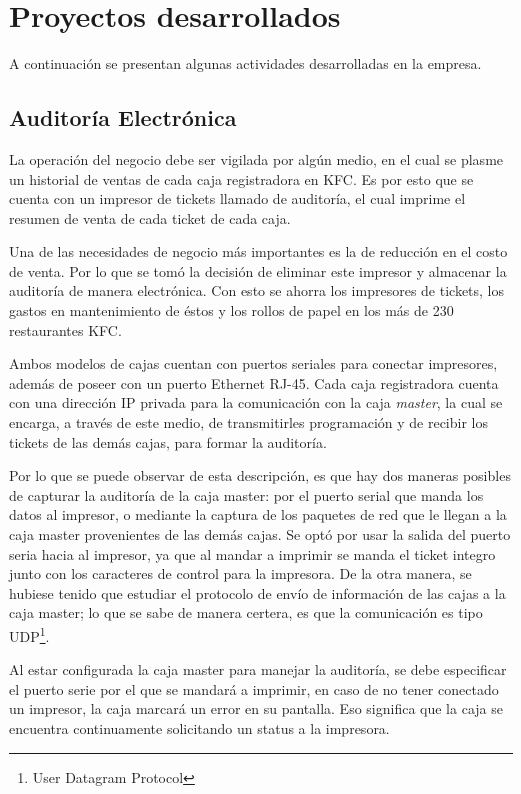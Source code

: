 
\chapter{Proyectos desarrollados}
\label{chap:desarrollo}

A continuación se presentan algunas actividades desarrolladas en la empresa.

\section{Auditoría Electrónica}
\label{sec:auditoria}

La operación del negocio debe ser vigilada por algún medio, en el cual se plasme un historial de ventas de cada caja registradora en KFC. Es por esto que se cuenta con un impresor de tickets llamado de auditoría, el cual imprime el resumen de venta de cada ticket de cada caja.

Una de las necesidades de negocio más importantes es la de reducción en el costo de venta. Por lo que se tomó la decisión de eliminar este impresor y almacenar la auditoría de manera electrónica. Con esto se ahorra los impresores de tickets, los gastos en mantenimiento de éstos y los rollos de papel en los más de 230 restaurantes KFC.

Ambos modelos de cajas cuentan con puertos seriales para conectar impresores, además de poseer con un puerto Ethernet RJ-45. Cada caja registradora cuenta con una dirección IP privada para la comunicación con la caja \textit{master}, la cual se encarga, a través de este medio, de transmitirles programación y de recibir los tickets de las demás cajas, para formar la auditoría. 

Por lo que se puede observar de esta descripción, es que hay dos maneras posibles de capturar la auditoría de la caja master: por el puerto serial que manda los datos al impresor, o mediante la captura de los paquetes de red que le llegan a la caja master provenientes de las demás cajas. Se optó por usar la salida del puerto seria hacia al impresor, ya que al mandar a imprimir se manda el ticket integro junto con los caracteres de control para la impresora. De la otra manera, se hubiese tenido que estudiar el protocolo de envío de información de las cajas a la caja master; lo que se sabe de manera certera, es que la comunicación es tipo UDP\footnote{User Datagram Protocol}.

Al estar configurada la caja master para manejar la auditoría, se debe especificar el puerto serie por el que se mandará a imprimir, en caso de no tener conectado un impresor, la caja marcará un error en su pantalla. Eso significa que la caja se encuentra continuamente solicitando un status a la impresora.

